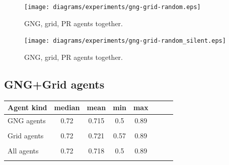 

\begin{figure}[h!]
  \centering                                
  \texttt{[image: diagrams/experiments/gng-grid-random.eps]}    
  \caption{GNG, grid, PR agents together.}
  \label{experiments:gng-grid-random}
\end{figure} 
  
\begin{figure}[h!]
  \centering                                
  \texttt{[image: diagrams/experiments/gng-grid-random\_silent.eps]}    
  \caption{GNG, grid, PR agents together.}
  \label{experiments:gng-grid-random-silent}
\end{figure} 
                                       
\subsection{GNG+Grid agents}

\begin{center} 
  \begin{tabular}{l*{6}{c}r}
  Agent kind        & median & mean & min & max \\
  \hline
  GNG agents        & 0.72                  & 0.715                 & 0.5                 & 0.89  \\  
                    & \color{green}{+0.03}  & \color{green}{+0.024} & \color{red}{-0.02}  & \color{green}{+0.03} \\
  Grid agents       & 0.72                  & 0.721                 & 0.57                & 0.89  \\  
                    & \color{green}{+0.02}  & \color{green}{+0.021} & \color{green}{+0.02}& \color{red}{+0.02}   \\
  All agents        & 0.72                  & 0.718                 & 0.5                 & 0.89  \\
                    & \color{green}{+0.02}  & \color{green}{+0.020}  & \color{red}{-0.02}  & \color{green}{+0.02} 
  \end{tabular}                       
\end{center}

